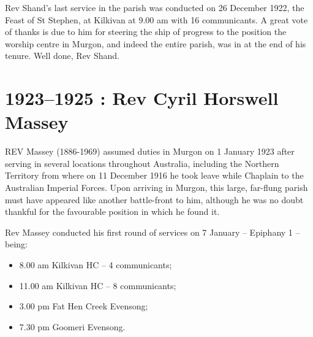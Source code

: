 Rev Shand's last service in the parish was conducted on 26 December 1922, the Feast of St Stephen, at Kilkivan at 9.00 am with 16 communicants. A great vote of thanks is due to him for steering the ship of progress to the position the worship centre in Murgon, and indeed the entire parish, was in at the end of his tenure. Well done, Rev Shand.



\begin{quote}

\end{quote}



\balance


\printendnotes[custom]
\setcounter{endnote}{0}
\chapter{1923--1925 : Rev Cyril Horswell Massey}
\nobalance


\lettrine[lines=3]{R}{EV}
 Massey (1886-1969) assumed duties in Murgon on 1 January 1923 after serving in several locations throughout Australia, including the Northern Territory from where on 11 December 1916 he took leave while Chaplain to the Australian Imperial Forces. Upon arriving in Murgon, this large, far-flung parish must have appeared like another battle-front to him, although he was no doubt thankful for the favourable position in which he found it.

Rev Massey conducted his first round of services on 7 January -- Epiphany 1 -- being:



\begin{itemize}

\item

  8.00 am Kilkivan HC -- 4 communicants;

\item

  11.00 am Kilkivan HC -- 8 communicants;

\item

  3.00 pm Fat Hen Creek Evensong;

\item

  7.30 pm Goomeri Evensong.

\end{itemize}



